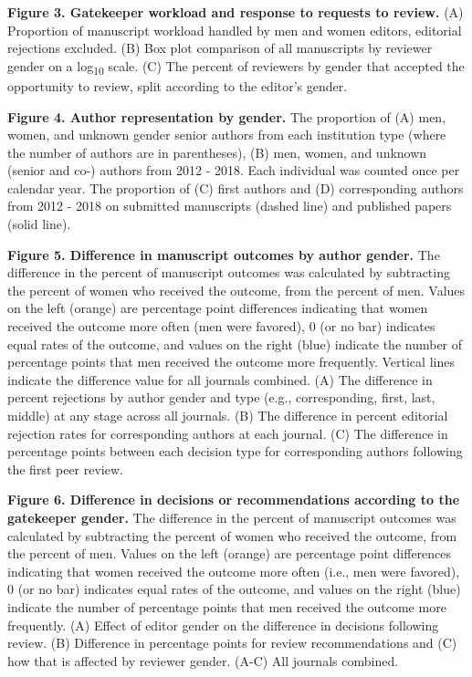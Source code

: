 \documentclass[11pt,]{article}
\begin{document}
\textbf{Figure 3. Gatekeeper workload and response to requests to
review.} (A) Proportion of manuscript workload handled by men and women
editors, editorial rejections excluded. (B) Box plot comparison of all
manuscripts by reviewer gender on a log\textsubscript{10} scale. (C) The
percent of reviewers by gender that accepted the opportunity to review,
split according to the editor's gender.

\textbf{Figure 4. Author representation by gender.} The proportion of
(A) men, women, and unknown gender senior authors from each institution
type (where the number of authors are in parentheses), (B) men, women,
and unknown (senior and co-) authors from 2012 - 2018. Each individual
was counted once per calendar year. The proportion of (C) first authors
and (D) corresponding authors from 2012 - 2018 on submitted manuscripts
(dashed line) and published papers (solid line).

\textbf{Figure 5. Difference in manuscript outcomes by author gender.}
The difference in the percent of manuscript outcomes was calculated by
subtracting the percent of women who received the outcome, from the
percent of men. Values on the left (orange) are percentage point
differences indicating that women received the outcome more often (men
were favored), 0 (or no bar) indicates equal rates of the outcome, and
values on the right (blue) indicate the number of percentage points that
men received the outcome more frequently. Vertical lines indicate the
difference value for all journals combined. (A) The difference in
percent rejections by author gender and type (e.g., corresponding,
first, last, middle) at any stage across all journals. (B) The
difference in percent editorial rejection rates for corresponding
authors at each journal. (C) The difference in percentage points between
each decision type for corresponding authors following the first peer
review.

\textbf{Figure 6. Difference in decisions or recommendations according
to the gatekeeper gender.} The difference in the percent of manuscript
outcomes was calculated by subtracting the percent of women who received
the outcome, from the percent of men. Values on the left (orange) are
percentage point differences indicating that women received the outcome
more often (i.e., men were favored), 0 (or no bar) indicates equal rates
of the outcome, and values on the right (blue) indicate the number of
percentage points that men received the outcome more frequently. (A)
Effect of editor gender on the difference in decisions following review.
(B) Difference in percentage points for review recommendations and (C)
how that is affected by reviewer gender. (A-C) All journals combined.
\end{document}

